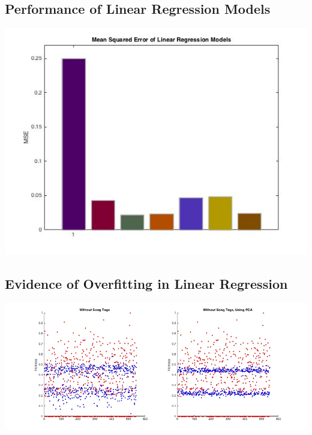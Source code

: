 \documentclass[12pt]{article}
\begin{document}
\subsection{Performance of Linear Regression Models}
\label{subsec:MSE}
\includegraphics[scale=.5]{images/lr/mse}
\subsection{Evidence of Overfitting in Linear Regression}
\label{subsec:overfitting}
\includegraphics[scale=.4]{images/lr/overfit}
\end{document}
